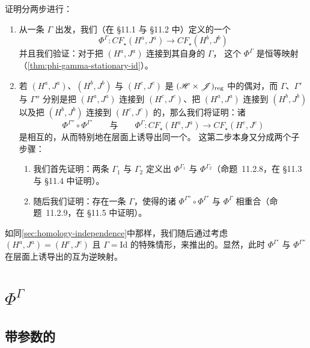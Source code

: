 证明分两步进行：
\begin{enumerate}[label=(\arabic*)]
\item 从一条\trHomotopy{} $\varGamma$ 出发，我们（在 §11.1 与 §11.2 中）定义\trComplex{}的一个\trMorphism
\[
\Phi^{\varGamma}\colon CF_{\star}(H^{a},J^{a})\longrightarrow CF_{\star}(H^{b},J^{b})
\]
并且我们验证：对于把 $(H^{a},J^{a})$ 连接到其自身的\trStationary\trHomotopy{} $\varGamma$，
这个\trMorphism{} $\Phi^{\varGamma}$ 是恒等映射（\cref{thm:phi-gamma-stationary-id}）。
\item 若 $(H^{a},J^{a})$、$(H^{b},J^{b})$ 与 $(H^{c},J^{c})$ 是
$(\mathscr{H}\times\mathscr{J})_{\mathrm{reg}}$ 中的偶对，而 $\varGamma$、$\varGamma'$ 与 $\varGamma''$
分别是把 $(H^{a},J^{a})$ 连接到 $(H^{c},J^{c})$、把 $(H^{a},J^{a})$ 连接到 $(H^{b},J^{b})$
以及把 $(H^{b},J^{b})$ 连接到 $(H^{c},J^{c})$ 的\trHomotopy，那么我们将证明：诸\trMorphism
\[
\Phi^{\varGamma''}\circ\Phi^{\varGamma'}
\qquad\text{与}\qquad
\Phi^{\varGamma}\colon CF_{\star}(H^{a},J^{a})\longrightarrow CF_{\star}(H^{c},J^{c})
\]
是相互\trHomotopic{}的，从而特别地在\trHomology{}层面上诱导出同一个\trMorphism。
这第二步本身又分成两个子步骤：
\begin{enumerate}[label=(\alph*)]
\item 我们首先证明：两条\trHomotopy{} $\varGamma_{1}$ 与 $\varGamma_{2}$ 定义出\trHomotopic
{}\trMorphism{} $\Phi^{\varGamma_{1}}$ 与 $\Phi^{\varGamma_{2}}$（命题~11.2.8，在 §11.3 与
§11.4 中证明）。
\item 随后我们证明：存在一条\trHomotopy{} $\varGamma$，使得\trComplex{}的诸\trMorphism{}
$\Phi^{\varGamma''}\circ\Phi^{\varGamma'}$ 与 $\Phi^{\varGamma}$ 相重合（命题~11.2.9，在 §11.5 中证明）。
\end{enumerate}
\end{enumerate}

如同\cref{sec:homology-independence}中那样，我们随后通过考虑 $(H^{a},J^{a})=(H^{c},J^{c})$
且 $\varGamma=\mathrm{Id}$ 的特殊情形，来推出\trFloerHomology{}的\trInvariance。显然，此时
$\Phi^{\varGamma'}$ 与 $\Phi^{\varGamma''}$ 在\trHomology{}层面上诱导出的\trIsomorphism{}互为逆映射。

\section{\trMorphism{} \texorpdfstring{$\Phi^{\varGamma}$}{Phi(Gamma)}}
\label{sec:morphism-phi-gamma}

\subsection{带参数的\trFloerEquation}
\label{subsec:floer-equation-parameters}


